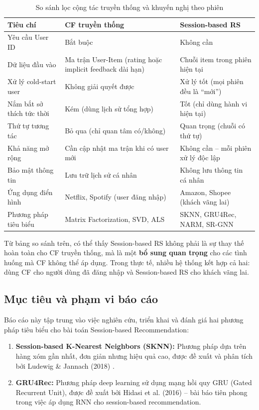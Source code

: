 \documentclass[12pt, a4paper]{article}
\begin{document}
\begin{table}[H]
\centering
\caption{So sánh lọc cộng tác truyền thống và khuyến nghị theo phiên}
\label{tab:cf_vs_session}
\begin{tabular}{L{4cm}L{5cm}L{5cm}}
\toprule
\textbf{Tiêu chí} & \textbf{CF truyền thống} & \textbf{Session-based RS} \\
\midrule
Yêu cầu User ID & Bắt buộc & Không cần \\
\midrule
Dữ liệu đầu vào & Ma trận User-Item (rating hoặc implicit feedback dài hạn) & Chuỗi item trong phiên hiện tại \\
\midrule
Xử lý cold-start user & Không giải quyết được & Xử lý tốt (mọi phiên đều là ``mới'') \\
\midrule
Nắm bắt sở thích tức thời & Kém (dùng lịch sử tổng hợp) & Tốt (chỉ dùng hành vi hiện tại) \\
\midrule
Thứ tự tương tác & Bỏ qua (chỉ quan tâm có/không) & Quan trọng (chuỗi có thứ tự) \\
\midrule
Khả năng mở rộng & Cần cập nhật ma trận khi có user mới & Không cần -- mỗi phiên xử lý độc lập \\
\midrule
Bảo mật thông tin & Lưu trữ lịch sử cá nhân & Không lưu thông tin cá nhân \\
\midrule
Ứng dụng điển hình & Netflix, Spotify (user đăng nhập) & Amazon, Shopee (khách vãng lai) \\
\midrule
Phương pháp tiêu biểu & Matrix Factorization, SVD, ALS & SKNN, GRU4Rec, NARM, SR-GNN \\
\bottomrule
\end{tabular}
\end{table}

Từ bảng so sánh trên, có thể thấy Session-based RS không phải là sự thay thế hoàn toàn cho CF truyền thống, mà là một \textbf{bổ sung quan trọng} cho các tình huống mà CF không thể áp dụng. Trong thực tế, nhiều hệ thống kết hợp cả hai: dùng CF cho người dùng đã đăng nhập và Session-based RS cho khách vãng lai.

\subsection{Mục tiêu và phạm vi báo cáo}

Báo cáo này tập trung vào việc nghiên cứu, triển khai và đánh giá hai phương pháp tiêu biểu cho bài toán Session-based Recommendation:

\begin{enumerate}
    \item \textbf{Session-based K-Nearest Neighbors (SKNN):} Phương pháp dựa trên hàng xóm gần nhất, đơn giản nhưng hiệu quả cao, được đề xuất và phân tích bởi Ludewig \& Jannach (2018) \cite{ludewig2018}.
    
    \item \textbf{GRU4Rec:} Phương pháp deep learning sử dụng mạng hồi quy GRU (Gated Recurrent Unit), được đề xuất bởi Hidasi et al. (2016) \cite{hidasi2016} -- bài báo tiên phong trong việc áp dụng RNN cho session-based recommendation.
\end{enumerate}
\end{document}
